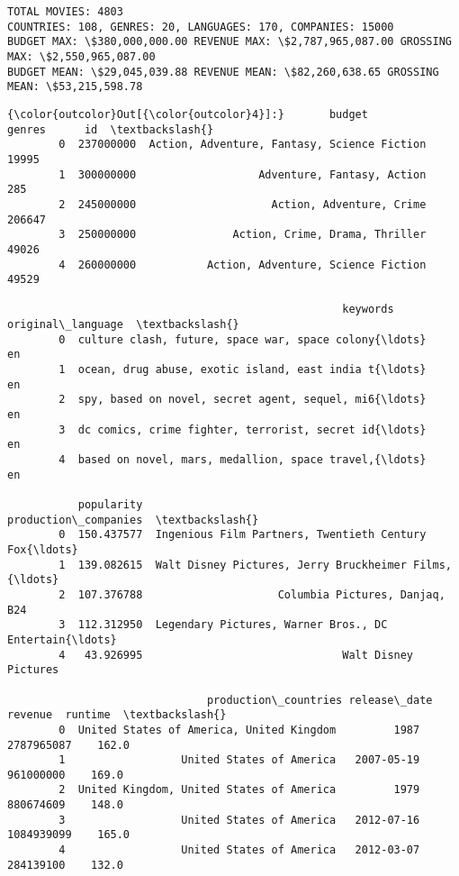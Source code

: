 \documentclass[11pt]{article}
\begin{document}
    \begin{Verbatim}[commandchars=\\\{\}]
TOTAL MOVIES: 4803
COUNTRIES: 108, GENRES: 20, LANGUAGES: 170, COMPANIES: 15000
BUDGET MAX: \$380,000,000.00 REVENUE MAX: \$2,787,965,087.00 GROSSING MAX: \$2,550,965,087.00
BUDGET MEAN: \$29,045,039.88 REVENUE MEAN: \$82,260,638.65 GROSSING MEAN: \$53,215,598.78

    \end{Verbatim}

\begin{Verbatim}[commandchars=\\\{\}]
{\color{outcolor}Out[{\color{outcolor}4}]:}       budget                                       genres      id  \textbackslash{}
        0  237000000  Action, Adventure, Fantasy, Science Fiction   19995   
        1  300000000                   Adventure, Fantasy, Action     285   
        2  245000000                     Action, Adventure, Crime  206647   
        3  250000000               Action, Crime, Drama, Thriller   49026   
        4  260000000           Action, Adventure, Science Fiction   49529   
        
                                                    keywords original\_language  \textbackslash{}
        0  culture clash, future, space war, space colony{\ldots}                en   
        1  ocean, drug abuse, exotic island, east india t{\ldots}                en   
        2  spy, based on novel, secret agent, sequel, mi6{\ldots}                en   
        3  dc comics, crime fighter, terrorist, secret id{\ldots}                en   
        4  based on novel, mars, medallion, space travel,{\ldots}                en   
        
           popularity                               production\_companies  \textbackslash{}
        0  150.437577  Ingenious Film Partners, Twentieth Century Fox{\ldots}   
        1  139.082615  Walt Disney Pictures, Jerry Bruckheimer Films,{\ldots}   
        2  107.376788                     Columbia Pictures, Danjaq, B24   
        3  112.312950  Legendary Pictures, Warner Bros., DC Entertain{\ldots}   
        4   43.926995                               Walt Disney Pictures   
        
                               production\_countries release\_date     revenue  runtime  \textbackslash{}
        0  United States of America, United Kingdom         1987  2787965087    162.0   
        1                  United States of America   2007-05-19   961000000    169.0   
        2  United Kingdom, United States of America         1979   880674609    148.0   
        3                  United States of America   2012-07-16  1084939099    165.0   
        4                  United States of America   2012-03-07   284139100    132.0   
        

\end{Verbatim}
\end{document}
